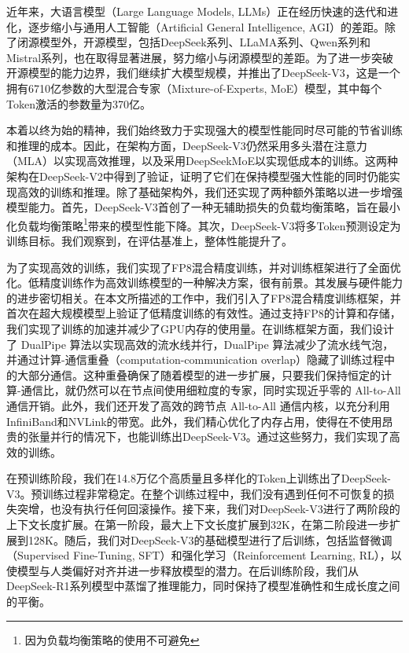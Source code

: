 \documentclass[lang=cn,a4paper,newtx]{elegantpaper}
\newcommand{\dsvii}{DeepSeek-V2}
\newcommand{\dsattn}{MLA}
\newcommand{\dsmoe}{DeepSeekMoE}
\newcommand{\dsviii}{DeepSeek-V3}
\begin{document}
近年来，大语言模型（Large Language Models, LLMs）正在经历快速的迭代和进化，逐步缩小与通用人工智能（Artificial General Intelligence, AGI）的差距。除了闭源模型外，开源模型，包括DeepSeek系列、LLaMA系列、Qwen系列和Mistral系列，也在取得显著进展，努力缩小与闭源模型的差距。为了进一步突破开源模型的能力边界，我们继续扩大模型规模，并推出了\dsviii{}，这是一个拥有6710亿参数的大型混合专家（Mixture-of-Experts, MoE）模型，其中每个Token激活的参数量为370亿。

本着以终为始的精神，我们始终致力于实现强大的模型性能同时尽可能的节省训练和推理的成本。因此，在架构方面，\dsviii{}仍然采用多头潜在注意力（\dsattn{}）以实现高效推理，以及采用\dsmoe{}以实现低成本的训练。这两种架构在\dsvii{}中得到了验证，证明了它们在保持模型强大性能的同时仍能实现高效的训练和推理。除了基础架构外，我们还实现了两种额外策略以进一步增强模型能力。首先，\dsviii{}首创了一种无辅助损失的负载均衡策略，旨在最小化负载均衡策略\footnote{因为负载均衡策略的使用不可避免}带来的模型性能下降。其次，\dsviii{}将多Token预测设定为训练目标。我们观察到，在评估基准上，整体性能提升了。

为了实现高效的训练，我们实现了FP8混合精度训练，并对训练框架进行了全面优化。低精度训练作为高效训练模型的一种解决方案，很有前景。其发展与硬件能力的进步密切相关。在本文所描述的工作中，我们引入了FP8混合精度训练框架，并首次在超大规模模型上验证了低精度训练的有效性。通过支持FP8的计算和存储，我们实现了训练的加速并减少了GPU内存的使用量。在训练框架方面，我们设计了 DualPipe 算法以实现高效的流水线并行，DualPipe 算法减少了流水线气泡，并通过计算-通信重叠（computation-communication overlap）隐藏了训练过程中的大部分通信。这种重叠确保了随着模型的进一步扩展，只要我们保持恒定的计算-通信比，就仍然可以在节点间使用细粒度的专家，同时实现近乎零的 All-to-All 通信开销。此外，我们还开发了高效的跨节点 All-to-All 通信内核，以充分利用InfiniBand和NVLink的带宽。此外，我们精心优化了内存占用，使得在不使用昂贵的张量并行的情况下，也能训练出\dsviii{}。通过这些努力，我们实现了高效的训练。

在预训练阶段，我们在14.8万亿个高质量且多样化的Token上训练出了\dsviii{}。预训练过程非常稳定。在整个训练过程中，我们没有遇到任何不可恢复的损失突增，也没有执行任何回滚操作。接下来，我们对\dsviii{}进行了两阶段的上下文长度扩展。在第一阶段，最大上下文长度扩展到32K，在第二阶段进一步扩展到128K。随后，我们对\dsviii{}的基础模型进行了后训练，包括监督微调（Supervised Fine-Tuning, SFT）和强化学习（Reinforcement Learning, RL），以使模型与人类偏好对齐并进一步释放模型的潜力。在后训练阶段，我们从DeepSeek-R1系列模型中蒸馏了推理能力，同时保持了模型准确性和生成长度之间的平衡。
\end{document}
